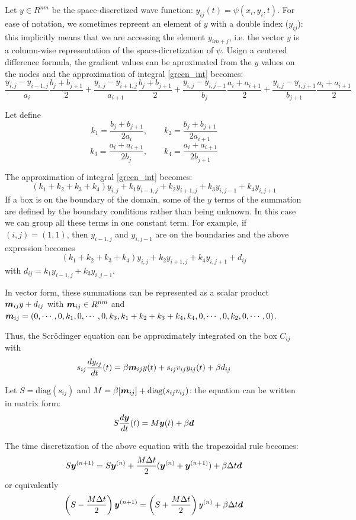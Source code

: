 \documentclass[a4paper,10pt]{article}
\newcommand{\ve}[1]{\mbox{\boldmath $ #1$}}
\begin{document}
Let $y \in R^{nm}$ be the space-discretized wave function: $y_{ij}(t) = \psi(x_i, y_i, t)$. For ease of notation, we sometimes repreent an element of $y$ with a double index ($y_{ij}$): this implicitly means that we are accessing the element $y_{im+j}$, i.e. the vector $y$ is a column-wise representation of the space-dicretization of $\psi$.
Usign a centered difference formula, the gradient values can be aproximated from the $y$ values on the nodes and the approximation of integral \ref{green_int} becomes:
$$ \frac{y_{i,j}-y_{i-1,j}}{a_i} \frac{b_j+b_{j+1}}{2} +
   \frac{y_{i,j}-y_{i+1,j}}{a_{i+1}} \frac{b_j+b_{j+1}}{2} +
   \frac{y_{i,j}-y_{i,j-1}}{b_j} \frac{a_i+a_{i+1}}{2} +
   \frac{y_{i,j}-y_{i,j+1}}{b_{j+1}} \frac{a_i+a_{i+1}}{2} $$

Let define
$$ k_1 = \frac{b_j+b_{j+1}}{2a_i}, \qquad k_2 = \frac{b_j+b_{j+1}}{2a_{i+1}} $$
$$ k_3 = \frac{a_i+a_{i+1}}{2b_j}, \qquad k_4 = \frac{a_i+a_{i+1}}{2b_{j+1}} $$

The approximation of integral \ref{green_int} becomes:
$$ (k_1+k_2+k_3+k_4) y_{i, j} + k_1 y_{i-1,j} + k_2 y_{i+1,j} + k_3 y_{i,j-1} + k_4 y_{i,j+1} $$
If a box is on the boundary of the domain, some of the $y$ terms of the summation are defined by the boundary conditions rather than being unknown. In this case we can group all these terms in one constant term. For example, if $(i, j) = (1, 1)$, then $y_{i-1,j}$ and $y_{i,j-1}$ are on the boundaries and the above expression becomes
$$ (k_1+k_2+k_3+k_4) y_{i, j} + k_2 y_{i+1,j} + k_4 y_{i,j+1} + d_{ij}$$
with $ d_{ij} = k_1 y_{i-1,j} + k_3 y_{i,j-1} $.

In vector form, these summations can be represented as a scalar product $\ve m_{ij} y + d_{ij}$ with $\ve m_{ij} \in R^{nm}$ and
$\ve m_{ij} = (0,\cdots, 0, k_1, 0, \cdots, 0, k_3, k_1+k_2+k_3+k_4, k_4, 0,\cdots, 0, k_2, 0, \cdots, 0)$.

Thus, the Scr\"{o}dinger equation can be approximately integrated on the box $C_{ij}$ with
$$ s_{ij} \frac{d y_{ij}}{dt}(t) =  \beta \ve m_{ij} y(t) + s_{ij} v_{ij} y_{ij}(t) + \beta d_{ij}$$

Let $S = \mbox{diag}(s_{ij})$ and $M = \beta [\ve m_{ij}] + \mbox{diag}(s_{ij}v_{ij})$: the equation can be written in matrix form:
$$ S \frac{d \ve y}{dt}(t) = M \ve y(t) + \beta \ve d$$

The time discretization of the above equation with the trapezoidal rule becomes:
$$ S \ve y^{(n+1)} = S \ve y^{(n)} + \frac{M \Delta t}{2} (\ve y^{(n)} + \ve y^{(n+1)}) + \beta \Delta t \ve d$$
or equivalently
$$ \left( S - \frac{M \Delta t}{2} \right) \ve y^{(n+1)} = \left( S + \frac{M \Delta t}{2} \right) y^{(n)} + \beta \Delta t \ve d $$
\end{document}
